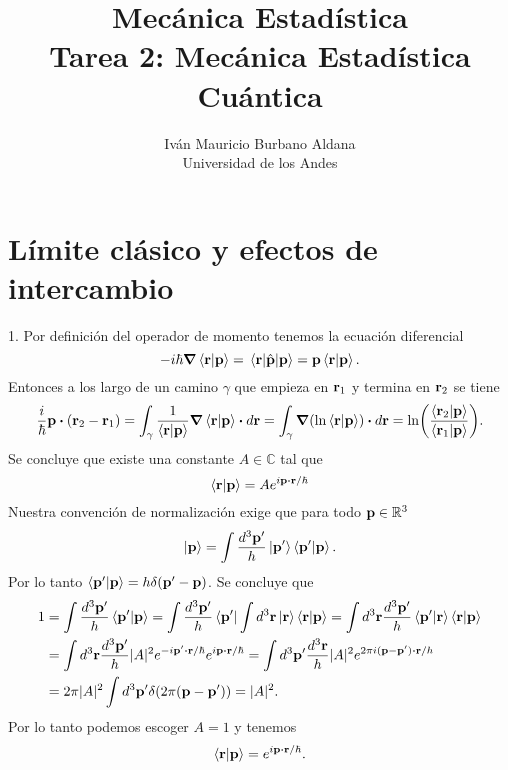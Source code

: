 \documentclass{article}
\author{Iván Mauricio Burbano Aldana\\Universidad de los Andes}
\title{Mecánica Estadística\\Tarea 2: Mecánica Estadística Cuántica}
\begin{document}
\maketitle

\section*{Límite clásico y efectos de intercambio}

1. Por definición del operador de momento tenemos la ecuación diferencial
\begin{equation}
-i\hbar\grad{\ip{\vb{r}}{\vb{p}}}=\mel{\vb{r}}{\hat{\vb{p}}}{\vb{p}}=\vb{p}\ip{\vb{r}}{\vb{p}}.
\end{equation}
Entonces a los largo de un camino $\gamma$ que empieza en $\vb{r}_1$ y termina en $\vb{r}_2$ se tiene
\begin{equation}
\frac{i}{\hbar}\vb{p}\vdot(\vb{r}_2-\vb{r}_1)=\int_\gamma\frac{1}{\ip{\vb{r}}{\vb{p}}}\grad{\ip{\vb{r}}{\vb{p}}}\vdot d\vb{r}=\int_\gamma\grad(\ln{\ip{\vb{r}}{\vb{p}}})\vdot d\vb{r}=\ln(\frac{\ip{\vb{r}_2}{\vb{p}}}{\ip{\vb{r}_1}{\vb{p}}}).
\end{equation}
Se concluye que existe una constante $A\in\mathbb{C}$ tal que
\begin{equation}
\ip{\vb{r}}{\vb{p}}=Ae^{i\vb{p}\vdot\vb{r}/\hbar}
\end{equation}
Nuestra convención de normalización exige que para todo $\vb{p}\in\mathbb{R}^3$
\begin{equation}
\ket{\vb{p}}=\int \frac{d^3{\vb{p}'}}{h}\ket{\vb{p}'}\ip{\vb{p}'}{\vb{p}}.
\end{equation}
Por lo tanto $\ip{\vb{p}'}{\vb{p}}=h\delta(\vb{p}'-\vb{p})$. Se concluye que
\begin{align}
\begin{split}
1&=\int \frac{d^3\vb{p}'}{h}\ip{\vb{p}'}{\vb{p}}=\int \frac{d^3\vb{p}'}{h}\bra{\vb{p}'}\int d^3\vb{r}\ket{\vb{r}}\ip{\vb{r}}{\vb{p}}=\int d^3\vb{r}\frac{d^3\vb{p}'}{h}\bra{\vb{p}'}\ket{\vb{r}}\ip{\vb{r}}{\vb{p}}\\
&=\int d^3\vb{r}\frac{d^3\vb{p}'}{h}|A|^2e^{-i\vb{p}'\vdot\vb{r}/\hbar}e^{i\vb{p}\vdot\vb{r}/\hbar}=\int d^3\vb{p}'\frac{d^3\vb{r}}{h}|A|^2e^{2\pi i(\vb{p}-\vb{p}')\vdot\vb{r}/h}\\
&=2\pi|A|^2\int d^3\vb{p}'\delta(2\pi(\vb{p}-\vb{p}'))=|A|^2.
\end{split}
\end{align}
Por lo tanto podemos escoger $A=1$ y tenemos
\begin{equation}
\ip{\vb{r}}{\vb{p}}=e^{i\vb{p}\vdot\vb{r}/\hbar}.
\end{equation}
\end{document}
